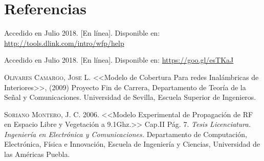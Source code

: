 \chapter*{Referencias}

\begin{enumerate}[{[1]}]
\item{Accedido en Julio 2018. [En línea]. Disponible en: \url{http://tools.dlink.com/intro/wfp/help} \label{fig:prop}}
\item{Accedido en Julio 2018. [En línea]. Disponible en: \url{https://goo.gl/esTKaJ} \label{fig:paginaHP}}
\item{\textsc{Olivares Camargo, Jose L.} <<Modelo de Cobertura Para redes Inalámbricas de Interiores>>, (2009) Proyecto Fin de Carrera, Departamento de Teoría de la Señal y Comunicaciones. Universidad de Sevilla, Escuela Superior de Ingenieros.\label{pdf:1}}
\item{ \textsc{Soriano Montero, J. C.} 2006. <<Modelo Experimental de Propagación de RF en Espacio Libre y Vegetación a 9.1Ghz.>> Cap.II Pág. 7.  \textit{Tesis Licenciatura. Ingeniería en Electrónica y Comunicaciones.} Departamento de Computación, Electrónica, Física e Innovación, Escuela de Ingeniería y Ciencias, Universidad de las Américas Puebla. \label{pdf:modprop}}
\end{enumerate}